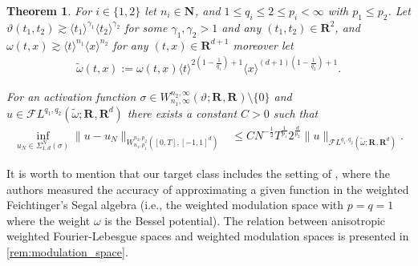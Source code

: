 \documentclass[a4paper]{article}
\newcommand{\nn}[1]{\mathbf{N}^{#1}}
\newcommand{\rr}[1]{\mathbf{R}^{#1}}
\newcommand{\eabs}[1]{\langle #1\rangle}     %
\newcommand{\norm}[2]{\|#1\|_{#2}}
\newcommand{\F}[0]{\mathscr{F}}
\newcommand{\FL}[1]{\F L^{#1}}
\numberwithin{equation}{section}
\newtheorem{theorem}{Theorem}[section]
\theoremstyle{remark}
\begin{document}
\begin{theorem}
\label{thm:mainIntro}
    For $i\in\{1,2\}$ let $n_i \in\nn{}$,
    and $1\leq q_i\leq 2\leq p_i< \infty$ with $p_1\leq p_2$.
    Let $\vartheta(t_1,t_2)\gtrsim \eabs{t_1}^{\gamma_1}\eabs{t_2}^{\gamma_2} $
    for some $\gamma_1, \gamma_2>1$ and any $(t_1, t_2)\in \rr{2}$,
    and
    $\omega(t, x) \gtrsim \eabs{t}^{n_1}\eabs{x}^{n_2}$
    for any $(t,x)\in \rr{d+1}$
    moreover let
    \begin{align*}
        \tilde{\omega}(t,x):=
            \omega(t,x)
            \eabs{t}^{2(1-\frac{1}{q_1})+1}
            \eabs{x}^{(d+1)(1-\frac{1}{q_2})+1}.
    \end{align*}

    For an activation function
    $\sigma\in W_{n_1,\infty}^{n_2,\infty}(\vartheta;\rr{}, \rr{}){\setminus}\{0\}$
    and $u\in \mathscr{F}L^{q_1,q_2}(\tilde{\omega}; \rr{},\rr{d})$ there exists a constant $C>0$ such that
    \begin{align}
    \label{eq:ApproximationBoundIntro}
        \inf_{u_{N}\in\Sigma_{1,d}^{N}(\sigma)}
        \norm{u-u_N}{W_{n_1,p_1}^{n_2,p_2}([0,T],[-1,1]^d)}
        &\leq
        C N^{-\frac{1}{2}} T^{\frac{1}{p_1}} 2^{\frac{d}{p_2}}
        \norm{u}{\FL{q_1,q_2}(\tilde{\omega};\rr{}, \rr{d})}.
    \end{align}
\end{theorem}

It is worth to mention that our target class includes the setting of
\cite{Parhi23ModulationSpacesCurse},
where the authors measured the accuracy
of approximating a given function in the weighted
Feichtinger's Segal algebra
(i.e., the weighted modulation space with $p=q=1$ where the weight $\omega$ is the Bessel potential).
The relation between anisotropic weighted Fourier-Lebesgue spaces
and weighted modulation spaces is presented in \cref{rem:modulation_space}.
\end{document}
